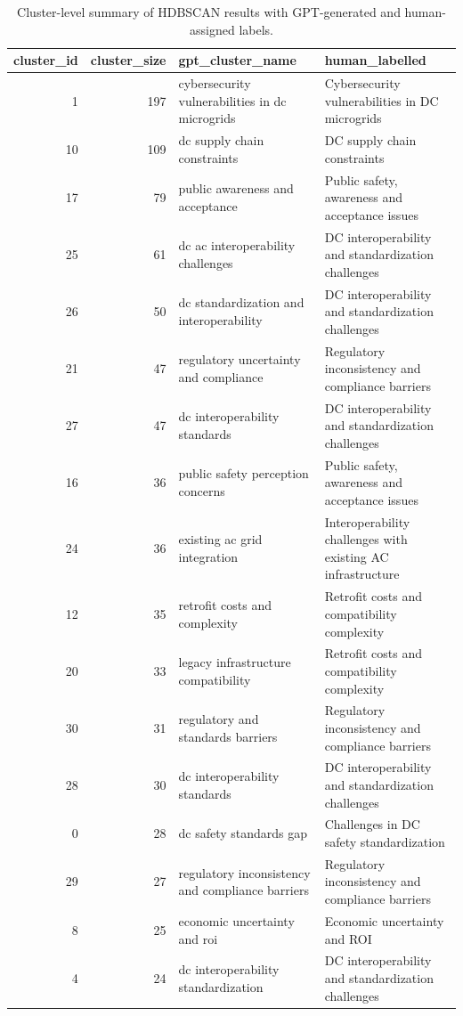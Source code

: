 \begin{table}
\caption{Cluster-level summary of HDBSCAN results with GPT-generated and human-assigned labels.}
\label{tab:cluster_id_size_name}
\begin{tabular}{rrll}
\toprule
cluster\_id & cluster\_size & gpt\_cluster\_name & human\_labelled \\
\midrule
1 & 197 & cybersecurity vulnerabilities in dc microgrids & Cybersecurity vulnerabilities in DC microgrids \\
10 & 109 & dc supply chain constraints & DC supply chain constraints \\
17 & 79 & public awareness and acceptance & Public safety, awareness and acceptance issues \\
25 & 61 & dc ac interoperability challenges & DC interoperability and standardization challenges \\
26 & 50 & dc standardization and interoperability & DC interoperability and standardization challenges \\
21 & 47 & regulatory uncertainty and compliance & Regulatory inconsistency and compliance barriers \\
27 & 47 & dc interoperability standards & DC interoperability and standardization challenges \\
16 & 36 & public safety perception concerns & Public safety, awareness and acceptance issues \\
24 & 36 & existing ac grid integration & Interoperability challenges with existing AC infrastructure \\
12 & 35 & retrofit costs and complexity & Retrofit costs and compatibility complexity \\
20 & 33 & legacy infrastructure compatibility & Retrofit costs and compatibility complexity \\
30 & 31 & regulatory and standards barriers & Regulatory inconsistency and compliance barriers \\
28 & 30 & dc interoperability standards & DC interoperability and standardization challenges \\
0 & 28 & dc safety standards gap & Challenges in DC safety standardization \\
29 & 27 & regulatory inconsistency and compliance barriers & Regulatory inconsistency and compliance barriers \\
8 & 25 & economic uncertainty and roi & Economic uncertainty and ROI \\
4 & 24 & dc interoperability standardization & DC interoperability and standardization challenges \\

\end{tabular}
\end{table}
